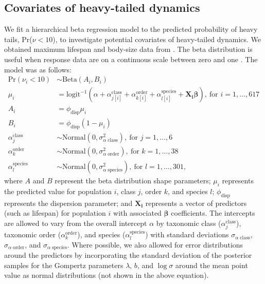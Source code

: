 \subsection{Covariates of heavy-tailed dynamics} We fit a hierarchical beta
regression model to the predicted probability of heavy tails, Pr(\(\nu < 10\)),
to investigate potential covariates of heavy-tailed dynamics. We obtained
maximum lifespan and body-size data from \citet{brook2006a}.
The beta distribution is useful when response data are on a continuous scale
between zero and one \citep{ferrari2004}. The model was as follows:
\begin{align}
\mathrm{Pr}(\nu_i < 10) &\sim \mathrm{Beta}(A_i, B_i)\\
\mu_i &= \mathrm{logit}^{-1}(\alpha
  + \alpha^\mathrm{class}_{j[i]}
  + \alpha^\mathrm{order}_{k[i]}
  + \alpha^\mathrm{species}_{l[i]}
  + \bm{X_i} \bm{\beta}),
  \: \text{for } i = 1, \dots, 617\\
A_i &= \phi_\mathrm{disp} \mu_i\\
B_i &= \phi_\mathrm{disp} (1 - \mu_i)\\
\alpha^\mathrm{class}_j &\sim
  \mathrm{Normal}(0, \sigma^2_{\alpha \; \mathrm{class}}),
  \: \text{for } j = 1, \dots, 6\\
\alpha^\mathrm{order}_k &\sim
  \mathrm{Normal}(0, \sigma^2_{\alpha \; \mathrm{order}}),
  \: \text{for } k = 1, \dots, 38\\
\alpha^\mathrm{species}_l &\sim
  \mathrm{Normal}(0, \sigma^2_{\alpha \; \mathrm{species}}),
  \: \text{for } l = 1, \dots, 301,
\end{align}
where \(A\) and \(B\) represent the beta distribution shape parameters;
\(\mu_i\) represents the predicted value for population \(i\), class \(j\),
order \(k\), and species \(l\); \(\phi_\mathrm{disp}\) represents the
dispersion parameter; and \(\bm{X_i}\) represents a vector of predictors (such as
lifespan) for population \(i\) with associated \(\bm{\beta}\) coefficients. The
intercepts are allowed to vary from the overall intercept \(\alpha\) by
taxonomic class (\(\alpha^\mathrm{class}_j\)), taxonomic order
(\(\alpha^\mathrm{order}_k\)), and species (\(\alpha^\mathrm{species}_l\)) with
standard deviations \(\sigma_{\alpha \; \mathrm{class}}\), \(\sigma_{\alpha \;
\mathrm{order}}\), and \(\sigma_{\alpha \; \mathrm{species}}\). Where possible,
we also allowed for error distributions around the predictors by incorporating
the standard deviation of the posterior samples for the Gompertz parameters
\(\lambda\), \(b\), and \(\log \sigma\) around the mean point value as normal
distributions (not shown in the above equation).

